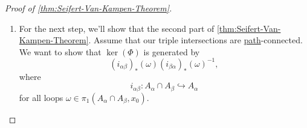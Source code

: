 \begin{proof}[Proof of \autoref{thm:Seifert-Van-Kampen-Theorem}]
\begin{enumerate}
		      Specifically, since
		      \begin{itemize}
			      \item \(A_{\alpha }\) is open for all \(\alpha \)
			      \item \(I\) is compact,
		      \end{itemize}
		      then for all \(i\), we choose a \hyperref[def:path]{path} \(h_{i}\) from \(x_0\) to \(\gamma (s_{i})\) in \(A_{\sigma _{i-1}}\cap A_{\alpha _{i}}\), using
		      \hyperref[def:path]{path}-connectedness of the pairwise intersections. Now, take \(\gamma \) and write it as
		      \[
			      \gamma = (\gamma _1\cdot \overline{h} _1)\cdot (\overline{h} _1\cdot \gamma _2)\cdot \ldots \cdot (\gamma_{n-1}\cdot \overline{h} _{n-1}) \cdot (h_{n-1}\cdot \gamma _n).
		      \]
		      Observe that each of these \hyperref[def:path]{paths} is fully contained in \(A_{\alpha _{i}}\), so this implies that \(\gamma \in \im  (\Phi )\), therefore
		      \(\Phi \) is surjective.
		\item For the next step, we'll show that the second part of \autoref{thm:Seifert-Van-Kampen-Theorem}. Assume that our triple intersections are \hyperref[def:path]{path}-connected.
		      We want to show that \(\ker (\Phi ) \) is generated by
		      \[
			      (i_{\alpha \beta })_\ast (\omega )(i_{\beta \alpha })_\ast (\omega )^{-1},
		      \]
		      where
		      \[
			      i_{\alpha \beta }\colon A_\alpha \cap A_\beta \hookrightarrow A_\alpha
		      \]
		      for all loops \(\omega \in\pi_1(A_\alpha \cap A_\beta , x_0)\).


\end{enumerate}
\end{proof}
